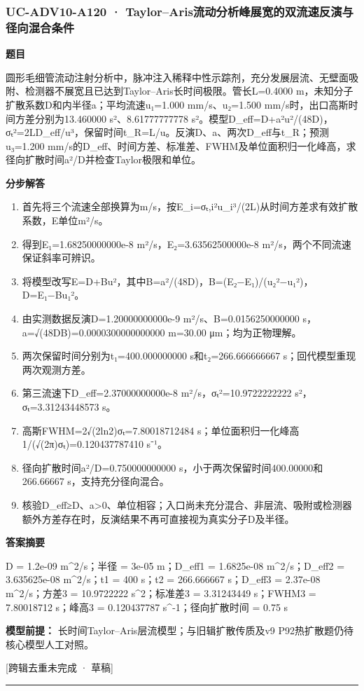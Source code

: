 \documentclass[UTF8,11pt,a4paper]{ctexart}
\begin{document}
\subsubsection*{UC-ADV10-A120 · Taylor–Aris流动分析峰展宽的双流速反演与径向混合条件}
\noindent\textbf{题目}\par
圆形毛细管流动注射分析中，脉冲注入稀释中性示踪剂，充分发展层流、无壁面吸附、检测器不展宽且已达到Taylor–Aris长时间极限。管长L=0.4000 m，未知分子扩散系数D和内半径a；平均流速u₁=1.000 mm/s、u₂=1.500 mm/s时，出口高斯时间方差分别为13.460000 s²、8.61777777778 s²。模型D\_eff=D+a²u²/(48D)，σₜ²=2LD\_eff/u³，保留时间t\_R=L/u。反演D、a、两次D\_eff与t\_R；预测u₃=1.200 mm/s的D\_eff、时间方差、标准差、FWHM及单位面积归一化峰高，求径向扩散时间a²/D并检查Taylor极限和单位。\par
\medskip\noindent\textbf{分步解答}
\begin{enumerate}
\item 首先将三个流速全部换算为m/s，按E\_i=σₜ,i²u\_i³/(2L)从时间方差求有效扩散系数，E单位m²/s。
\item 得到E₁=1.68250000000e-8 m²/s，E₂=3.63562500000e-8 m²/s，两个不同流速保证斜率可辨识。
\item 将模型改写E=D+Bu²，其中B=a²/(48D)，B=(E₂−E₁)/(u₂²−u₁²)，D=E₁−Bu₁²。
\item 由实测数据反演D=1.20000000000e-9 m²/s、B=0.0156250000000 s，a=√(48DB)=0.0000300000000000 m=30.00 μm；均为正物理解。
\item 两次保留时间分别为t₁=400.000000000 s和t₂=266.666666667 s；回代模型重现两次观测方差。
\item 第三流速下D\_eff=2.37000000000e-8 m²/s，σₜ²=10.9722222222 s²，σₜ=3.31243448573 s。
\item 高斯FWHM=2√(2ln2)σₜ=7.80018712484 s；单位面积归一化峰高1/(√(2π)σₜ)=0.120437787410 s⁻¹。
\item 径向扩散时间a²/D=0.750000000000 s，小于两次保留时间400.00000和266.66667 s，支持充分径向混合。
\item 核验D\_eff≥D、a>0、单位相容；入口尚未充分混合、非层流、吸附或检测器额外方差存在时，反演结果不再可直接视为真实分子D及半径。
\end{enumerate}
\noindent\textbf{答案摘要}\par
D = 1.2e-09 m\textasciicircum{}2/s；半径 = 3e-05 m；D\_eff1 = 1.6825e-08 m\textasciicircum{}2/s；D\_eff2 = 3.635625e-08 m\textasciicircum{}2/s；t1 = 400 s；t2 = 266.666667 s；D\_eff3 = 2.37e-08 m\textasciicircum{}2/s；方差3 = 10.9722222 s\textasciicircum{}2；标准差3 = 3.31243449 s；FWHM3 = 7.80018712 s；峰高3 = 0.120437787 s\textasciicircum{}-1；径向扩散时间 = 0.75 s\par
\noindent\textbf{模型前提：}
长时间Taylor–Aris层流模型；与旧辑扩散传质及v9 P92热扩散题仍待核心模型人工对照。\par
\noindent\textcolor{red!65!black}{[跨辑去重未完成 · 草稿]} \par
\medskip\hrule\medskip
{}
\end{document}
